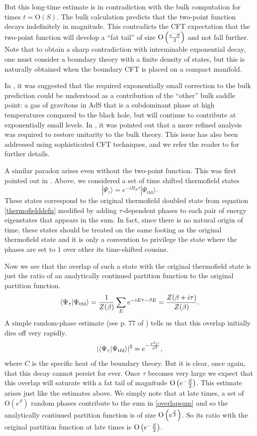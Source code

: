 \documentclass[12pt]{article}
\newcommand{\tfd}{\Psi_{\text{tfd}}} %
\newcommand{\tfdtau}{\Psi_{\tau}} %
\def\Or[#1]{{\text{O}}\left({#1}\right)}
\newcommand{\be}{\begin{equation}}
\newcommand{\ee}{\end{equation}}
\begin{document}
But this long-time estimate is in contradiction with the bulk computation for times $t = \Or[S]$. The bulk calculation predicts that the two-point function decays indefinitely in magnitude. This contradicts the CFT expectation that the  two-point function will develop a ``fat tail'' of size $\Or[e^{-S \over 2}]$ and not fall further.  Note that to obtain a sharp contradiction with interminable exponential decay, one must consider a boundary theory with a finite density of states, but this is naturally obtained when the boundary CFT is placed on a compact manifold. 

In  \cite{Maldacena:2001kr}, it was suggested that the required exponentially small correction to the bulk prediction  could be understood as a contribution of the ``other'' bulk saddle point:  a gas of gravitons in AdS that is a subdominant phase at high temperatures compared to the black hole, but will continue to contribute at exponentially small levels. In \cite{Barbon:2004ce,Barbon:2003aq}, it was pointed out that a more refined analysis was required to restore unitarity to the bulk theory. This issue has also been addressed using sophisticated CFT techniques, and we refer the reader to \cite{Fitzpatrick:2016mjq,Chen:2016cms,Anous:2016kss} for further details.


A similar paradox arises even without the two-point function. This was first pointed out in \cite{Papadodimas:2015xma}. Above, we considered a set of time shifted thermofield states
\be
|\tfdtau \rangle = e^{-i H_R \tau} |\tfd \rangle.
\ee
These states correspond to the original thermofield doubled state from equation \eqref{thermofielddefn} modified by adding $\tau$-dependent phases to each pair of energy eigenstates that appears in the sum. In fact, since 
there is no natural origin of time, these states should be treated on the same footing as the original thermofield state and it is only a convention to privilege the state where the phases are set to $1$ over other its time-shifted cousins. 

Now we see that the overlap of such a state with the original thermofield state is just the ratio of an analytically continued partition function to the original partition function.
\be
\label{overlapsum}
\langle \tfdtau | \tfd \rangle = {1 \over Z(\beta)} \sum_{E} e^{-i E \tau - {\beta E}} = {Z(\beta + i \tau) \over Z(\beta)}.
\ee
A simple random-phase estimate (see p. 77 of \cite{Papadodimas:2015jra}) tells us that this overlap initially dies off very rapidly. 
\be
\label{innerprod}
|\langle \tfdtau|  \tfd \rangle |^2 =  e^{-{\tau^2 C \over \beta^2}},
\ee
where $C$ is the specific heat of the boundary theory. But it is clear, once again, that this decay cannot persist for ever. Once $\tau$ becomes very large we expect that this overlap will saturate with a fat tail of magnitude $\Or[e^{-{S \over 2}}]$. This estimate arises just like the estimates above. We simply  note that at late times, a set of $\Or[e^{S}]$ random phases contribute to the sum in \eqref{overlapsum} and so the analytically continued partition function is of size $\Or[e^{{S \over 2}}]$. So its ratio with the original partition function at late times is $\Or[e^{-{S \over 2}}]$. 
\end{document}
